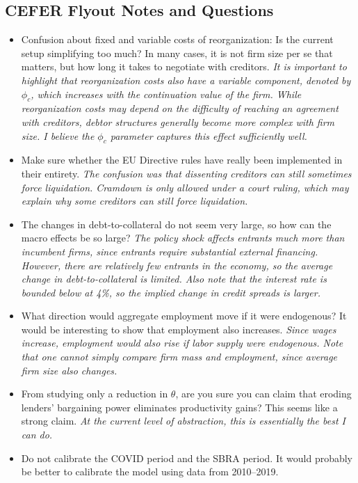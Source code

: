 \documentclass[12pt]{article}
\begin{document}
\subsection*{CEFER Flyout Notes and Questions}
\begin{itemize} \setlength\itemsep{0em} \small
    \item Confusion about fixed and variable costs of reorganization: Is the current setup simplifying too much? In many cases, it is not firm size per se that matters, but how long it takes to negotiate with creditors. 
    \textit{It is important to highlight that reorganization costs also have a variable component, denoted by $\phi_c$, which increases with the continuation value of the firm. While reorganization costs may depend on the difficulty of reaching an agreement with creditors, debtor structures generally become more complex with firm size. I believe the $\phi_c$ parameter captures this effect sufficiently well.}
    \item Make sure whether the EU Directive rules have really been implemented in their entirety. 
    \textit{The confusion was that dissenting creditors can still sometimes force liquidation. Cramdown is only allowed under a court ruling, which may explain why some creditors can still force liquidation.}
    \item The changes in debt-to-collateral do not seem very large, so how can the macro effects be so large? 
    \textit{The policy shock affects entrants much more than incumbent firms, since entrants require substantial external financing. However, there are relatively few entrants in the economy, so the average change in debt-to-collateral is limited. Also note that the interest rate is bounded below at 4\%, so the implied change in credit spreads is larger.}
    \item What direction would aggregate employment move if it were endogenous? It would be interesting to show that employment also increases. 
    \textit{Since wages increase, employment would also rise if labor supply were endogenous. Note that one cannot simply compare firm mass and employment, since average firm size also changes.}
    \item From studying only a reduction in $\theta$, are you sure you can claim that eroding lenders’ bargaining power eliminates productivity gains? This seems like a strong claim. 
    \textit{At the current level of abstraction, this is essentially the best I can do.}
    \item Do not calibrate the COVID period and the SBRA period. It would probably be better to calibrate the model using data from 2010–2019. 

\end{itemize}
\end{document}
